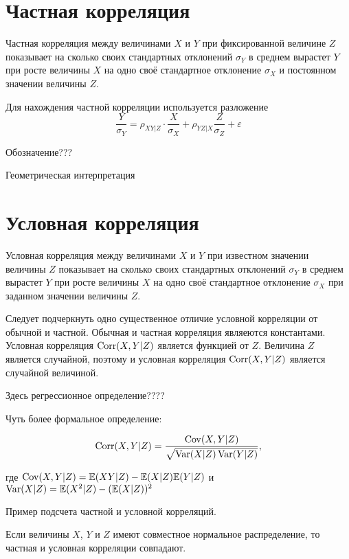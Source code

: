 \documentclass[10pt]{article}
\begin{document}
\section{Частная корреляция}

\begin{definition}
Частная корреляция между величинами $X$ и $Y$ при фиксированной величине $Z$ показывает на сколько своих стандартных отклонений $\sigma_Y$ в среднем вырастет $Y$ при росте величины $X$ на одно своё стандартное отклонение $\sigma_X$ и постоянном значении величины $Z$.
\end{definition}

Для нахождения частной корреляции используется разложение
\[
\frac{Y}{\sigma_Y}=\rho_{XY|Z} \cdot \frac{X}{\sigma_X} + \rho_{YZ|X} \frac{Z}{\sigma_Z} + \varepsilon
\]


Обозначение???

Геометрическая интерпретация

\section{Условная корреляция}

\begin{definition}
Условная корреляция между величинами $X$ и $Y$ при известном значении величины $Z$ показывает на сколько своих стандартных отклонений $\sigma_Y$ в среднем вырастет $Y$ при росте величины $X$ на одно своё стандартное отклонение $\sigma_X$ при заданном значении величины $Z$.
\end{definition}


Следует подчеркнуть одно существенное отличие условной корреляции от обычной и частной. Обычная и частная корреляция являеются константами. Условная корреляция $\operatorname{Corr}(X,Y|Z)$ является функцией от $Z$. Величина $Z$ является случайной, поэтому и условная корреляция $\operatorname{Corr}(X,Y|Z)$ является случайной величиной. 

Здесь регрессионное определение???? 

Чуть более формальное определение:

\begin{definition}
\[
\operatorname{Corr}(X,Y|Z) = \frac{\operatorname{Cov}(X,Y|Z)}{\sqrt{\operatorname{Var}(X|Z)\operatorname{Var}(Y|Z)}},
\]
\end{definition}

где $\operatorname{Cov}(X,Y|Z)=\mathbb{E}(XY|Z)-\mathbb{E}(X|Z)\mathbb{E}(Y|Z)$ и $\operatorname{Var}(X|Z)=\mathbb{E}(X^2|Z)-(\mathbb{E}(X|Z))^2$


Пример подсчета частной и условной корреляций.

\begin{theorem}
Если величины $X$, $Y$ и $Z$ имеют совместное нормальное распределение, то частная и условная корреляции совпадают.
\end{theorem}
\end{document}
